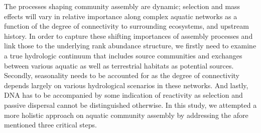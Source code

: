 \documentclass[12pt,a4paper]{article} %
\begin{document}
The processes shaping community assembly are dynamic; selection and mass effects will vary in relative importance along complex aquatic networks as a function of the degree of connectivity to surrounding ecosystems, and upstream history. In order to capture these shifting importances of assembly processes and link those to the underlying rank abundance structure, we firstly need to examine a true hydrologic continuum that includes source communities and exchanges between various aquatic as well as terrestrial habitats as potential sources. Secondly, seasonality needs to be accounted for as the degree of connectivity depends largely on various hydrological scenarios in these networks. And lastly, DNA has to be accompanied by some indication of reactivity as selection and passive dispersal cannot be distinguished otherwise. In this study, we attempted a more holistic approach on aquatic community assembly by addressing the afore mentioned three critical steps.

\end{document}
